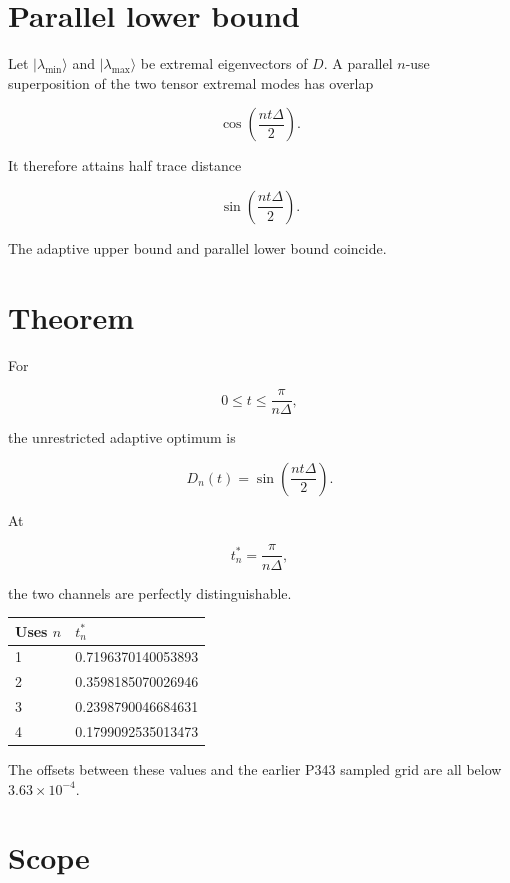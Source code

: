 \documentclass[11pt,a4paper,openany]{report}
\begin{document}
\section{Parallel lower bound}

Let \(|\lambda_{\min}\rangle\) and \(|\lambda_{\max}\rangle\) be extremal eigenvectors of \(D\). A parallel \(n\)-use superposition of the two tensor extremal modes has overlap

\[
\cos\!\left(\frac{nt\Delta}{2}\right).
\]

It therefore attains half trace distance

\[
\sin\!\left(\frac{nt\Delta}{2}\right).
\]

The adaptive upper bound and parallel lower bound coincide.

\section{Theorem}

For

\[
0\leq t\leq\frac{\pi}{n\Delta},
\]

the unrestricted adaptive optimum is

\[
\boxed{
D_n(t)=
\sin\!\left(\frac{nt\Delta}{2}\right)
}.
\]

At

\[
t_n^*=\frac{\pi}{n\Delta},
\]

the two channels are perfectly distinguishable.

\begin{center}
\begingroup\small
\setlength{\tabcolsep}{2.5pt}
\renewcommand{\arraystretch}{1.16}
\begin{longtable}{@{}p{}p{}@{}}
\toprule
\textbf{Uses \(n\)} & \textbf{\(t_n^*\)} \\
\midrule
\endhead
1 & 0.7196370140053893 \\
2 & 0.3598185070026946 \\
3 & 0.2398790046684631 \\
4 & 0.1799092535013473 \\
\bottomrule
\end{longtable}
\endgroup
\end{center}

The offsets between these values and the earlier P343 sampled grid are all below \(3.63\times10^{-4}\).

\section{Scope}
\end{document}
